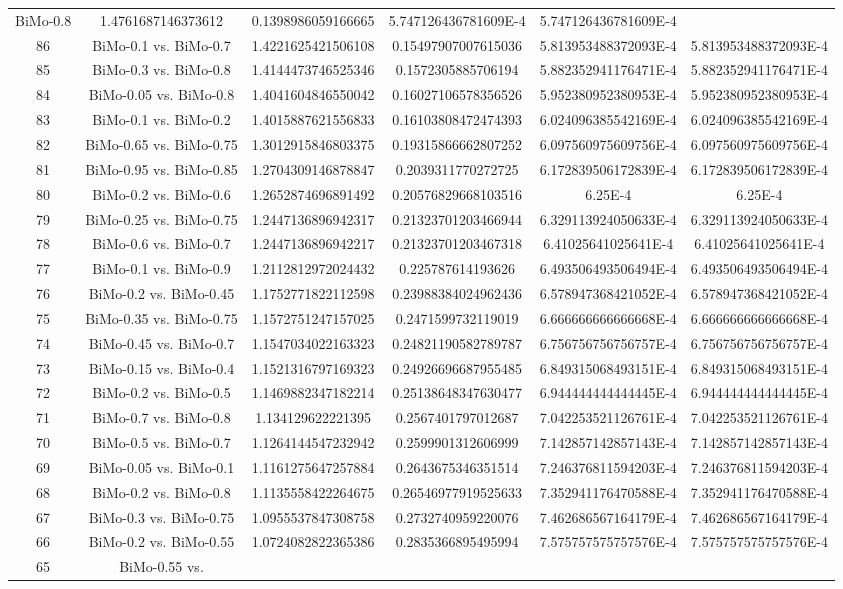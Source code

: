\documentclass[a4paper,10pt]{article}
\begin{document}
\begin{landscape}
\begin{table}[!htp]
\begin{tabular}{cccccc}
BiMo-0.8&1.4761687146373612&0.1398986059166665&5.747126436781609E-4&5.747126436781609E-4\\86&BiMo-0.1 vs. BiMo-0.7&1.4221625421506108&0.15497907007615036&5.813953488372093E-4&5.813953488372093E-4\\85&BiMo-0.3 vs. BiMo-0.8&1.4144473746525346&0.1572305885706194&5.882352941176471E-4&5.882352941176471E-4\\84&BiMo-0.05 vs. BiMo-0.8&1.4041604846550042&0.16027106578356526&5.952380952380953E-4&5.952380952380953E-4\\83&BiMo-0.1 vs. BiMo-0.2&1.4015887621556833&0.16103808472474393&6.024096385542169E-4&6.024096385542169E-4\\82&BiMo-0.65 vs. BiMo-0.75&1.3012915846803375&0.19315866662807252&6.097560975609756E-4&6.097560975609756E-4\\81&BiMo-0.95 vs. BiMo-0.85&1.2704309146878847&0.2039311770272725&6.172839506172839E-4&6.172839506172839E-4\\80&BiMo-0.2 vs. BiMo-0.6&1.2652874696891492&0.20576829668103516&6.25E-4&6.25E-4\\79&BiMo-0.25 vs. BiMo-0.75&1.2447136896942317&0.21323701203466944&6.329113924050633E-4&6.329113924050633E-4\\78&BiMo-0.6 vs. BiMo-0.7&1.2447136896942217&0.21323701203467318&6.41025641025641E-4&6.41025641025641E-4\\77&BiMo-0.1 vs. BiMo-0.9&1.2112812972024432&0.225787614193626&6.493506493506494E-4&6.493506493506494E-4\\76&BiMo-0.2 vs. BiMo-0.45&1.1752771822112598&0.23988384024962436&6.578947368421052E-4&6.578947368421052E-4\\75&BiMo-0.35 vs. BiMo-0.75&1.1572751247157025&0.2471599732119019&6.666666666666668E-4&6.666666666666668E-4\\74&BiMo-0.45 vs. BiMo-0.7&1.1547034022163323&0.24821190582789787&6.756756756756757E-4&6.756756756756757E-4\\73&BiMo-0.15 vs. BiMo-0.4&1.1521316797169323&0.24926696687955485&6.849315068493151E-4&6.849315068493151E-4\\72&BiMo-0.2 vs. BiMo-0.5&1.1469882347182214&0.25138648347630477&6.944444444444445E-4&6.944444444444445E-4\\71&BiMo-0.7 vs. BiMo-0.8&1.134129622221395&0.2567401797012687&7.042253521126761E-4&7.042253521126761E-4\\70&BiMo-0.5 vs. BiMo-0.7&1.1264144547232942&0.2599901312606999&7.142857142857143E-4&7.142857142857143E-4\\69&BiMo-0.05 vs. BiMo-0.1&1.1161275647257884&0.2643675346351514&7.246376811594203E-4&7.246376811594203E-4\\68&BiMo-0.2 vs. BiMo-0.8&1.1135558422264675&0.26546977919525633&7.352941176470588E-4&7.352941176470588E-4\\67&BiMo-0.3 vs. BiMo-0.75&1.0955537847308758&0.2732740959220076&7.462686567164179E-4&7.462686567164179E-4\\66&BiMo-0.2 vs. BiMo-0.55&1.0724082822365386&0.2835366895495994&7.575757575757576E-4&7.575757575757576E-4\\65&BiMo-0.55 vs. 
\end{tabular}
\end{table}
\end{landscape}
\end{document}
